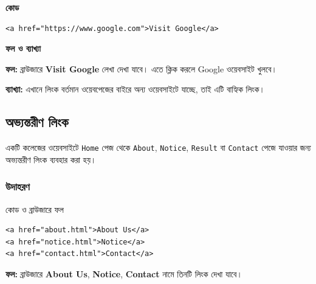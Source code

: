 \par\noindent
\begin{minipage}[t]{.54\linewidth}\vspace{0pt}\small
\textbf{\color{chFourTeal}কোড}\par
\begin{verbatim}
<a href="https://www.google.com">Visit Google</a>
\end{verbatim}

\par\smallskip
\end{minipage}\hfill
\begin{minipage}[t]{.42\linewidth}\vspace{0pt}\small
\textbf{\color{chFourTeal}ফল ও ব্যাখ্যা}\par
\textbf{ফল:} ব্রাউজারে \textbf{Visit Google} লেখা দেখা যাবে। এতে ক্লিক করলে Google ওয়েবসাইট খুলবে।

\textbf{ব্যাখ্যা:} এখানে লিংক বর্তমান ওয়েবপেজের বাইরে অন্য ওয়েবসাইটে যাচ্ছে, তাই এটি বাহ্যিক লিংক।
\par\smallskip
\end{minipage}\par




\subsection{অভ্যন্তরীণ লিংক}



একটি কলেজের ওয়েবসাইটে \texttt{Home} পেজ থেকে \texttt{About}, \texttt{Notice}, \texttt{Result} বা \texttt{Contact} পেজে যাওয়ার জন্য অভ্যন্তরীণ লিংক ব্যবহার করা হয়।

\subsubsection{উদাহরণ}

\begin{chFourWholeExample}{কোড ও ব্রাউজারে ফল}
\noindent
\begin{minipage}[t]{.50\linewidth}\vspace{0pt}

\begin{verbatim}
<a href="about.html">About Us</a>
<a href="notice.html">Notice</a>
<a href="contact.html">Contact</a>
\end{verbatim}

\end{minipage}\hfill
\begin{minipage}[t]{.46\linewidth}\vspace{0pt}
\textbf{ফল:} ব্রাউজারে \textbf{About Us}, \textbf{Notice}, \textbf{Contact} নামে তিনটি লিংক দেখা যাবে।
\end{minipage}
\end{chFourWholeExample}

